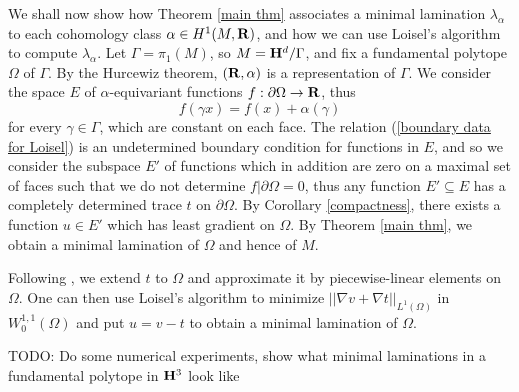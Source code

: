 We shall now show how Theorem \ref{main thm} associates a minimal lamination $\lambda_\alpha$ to each cohomology class $\alpha \in H^1(M, \mathbf{R})$, and how we can use Loisel's algorithm to compute $\lambda_\alpha$.
Let $\Gamma = \pi_1(M)$, so $M = \mathbf H^d/\Gamma$, and fix a fundamental polytope $\Omega$ of $\Gamma$.
By the Hurcewiz theorem, $(\mathbf{R}, \alpha)$ is a representation of $\Gamma$.
We consider the space $E$ of $\alpha$-equivariant functions $f: \partial \Omega \to \mathbf{R}$, thus
\begin{equation}\label{boundary data for Loisel}
f(\gamma x) = f(x) + \alpha(\gamma)
\end{equation}
for every $\gamma \in \Gamma$, which are constant on each face.
The relation (\ref{boundary data for Loisel}) is an undetermined boundary condition for functions in $E$, and so we consider the subspace $E'$ of functions which in addition are zero on a maximal set of faces such that we do not determine $f|\partial \Omega = 0$, thus any function $E' \subseteq E$ has a completely determined trace $t$ on $\partial \Omega$.
By Corollary \ref{compactness}, there exists a function $u \in E'$ which has least gradient on $\Omega$.
By Theorem \ref{main thm}, we obtain a minimal lamination of $\Omega$ and hence of $M$.

Following \cite[\S4]{Loisel20}, we extend $t$ to $\Omega$ and approximate it by piecewise-linear elements on $\Omega$.
One can then use Loisel's algorithm to minimize $||\nabla v + \nabla t||_{L^1(\Omega)}$ in $W^{1, 1}_0(\Omega)$ and put $u = v - t$ to obtain a minimal lamination of $\Omega$.

TODO: Do some numerical experiments, show what minimal laminations in a fundamental polytope in $\mathbf H^3$ look like
